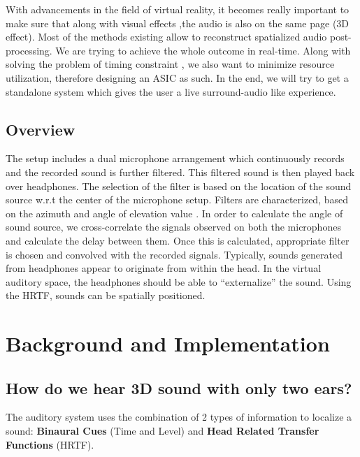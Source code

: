 \documentclass[BTech]{nitkdiss}
\begin{document}
With advancements in the field of virtual reality, it becomes really important to make sure that along with visual effects ,the audio is also on the same page (3D effect). Most of the methods existing allow to reconstruct spatialized audio post-processing. We are trying to achieve the whole outcome in real-time. Along with solving the problem of timing constraint , we also want to minimize resource utilization, therefore designing an ASIC as such. In the end, we will try to get a standalone system which gives the user a live surround-audio like experience.

\section{Overview}          
The setup includes a dual microphone arrangement which continuously records and the recorded sound is further filtered. This filtered sound is then played back over headphones. The selection of the filter is based on the location of the sound source w.r.t the center of the microphone setup. Filters are characterized, based on the azimuth and angle of elevation value . \newline
In order to calculate the angle of sound source, we cross-correlate the signals observed on both the microphones and calculate the delay between them. Once this is calculated, appropriate filter is chosen and convolved with the recorded signals. Typically, sounds generated from headphones appear to originate from within the head. In the virtual auditory space, the headphones should be able to “externalize” the sound. Using the HRTF, sounds can be spatially positioned.

\chapter{Background and Implementation}
\section{How do we hear 3D sound with only two ears?}
The auditory system uses the combination of 2 types of information to localize a sound: \textbf{Binaural Cues} (Time and Level) and \textbf{Head Related Transfer Functions} (HRTF).
\end{document}
